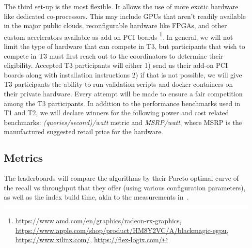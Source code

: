 The third set-up is the most flexible. It allows the use of more exotic 
hardware like dedicated co-processors. %
This may include GPUs that aren't readily available in the major public clouds, reconfigurable hardware like FPGAs, and other custom accelerators 
available as add-on PCI boards%
\footnote{\url{https://www.amd.com/en/graphics/radeon-rx-graphics},
\url{https://www.apple.com/shop/product/HM8Y2VC/A/blackmagic-egpu},
\url{https://www.xilinx.com/},
\url{https://flex-logix.com/}}.
In general, we will not limit the type of hardware that can compete in T3, but 
participants that wish to compete in T3 must first reach out to the coordinators to determine their eligibility.  Accepted T3 participants
will either 1) send us their add-on PCI boards along with installation instructions 2) if that is not possible, we will give
T3 participants the ability to run validation scripts and docker containers on their private hardware.  Every attempt will
be made to ensure a fair competition among the T3 participants.  In addition to the performance benchmarks used in T1 and T2, we will declare
winners for the following power and cost related benchmarks: \emph{(queries/second)/watt} metric and \emph{MSRP/watt}, where MSRP is the
manufactured suggested retail price for the hardware.


\subsection{Metrics}
\label{metrics}


The leaderboards will compare the algorithms by their Pareto-optimal
curve of the recall vs throughput that they offer (using various
configuration parameters), as well as the index build time, akin to
the measurements in~\cite{Benchmark}.


\iffalse 
The evaluation for tracks T1 and T2 will be run by the organizers on
normalized hardware.  T1: machine with 64GB RAM (memory shared by
index with OS and standard libraries); T2: same machine with an
additional 1 TB of SSD.  For T3, since the hardware is non standard,
the participants are expected run the evaluation themselves using the
evaluation scripts provided by the organizers.  Some T3 participants
may wish to send us their custom accelerator hardware for the
evaluation phase.  We will accommodate those requests on a case-by-case
basis.
\fi 




